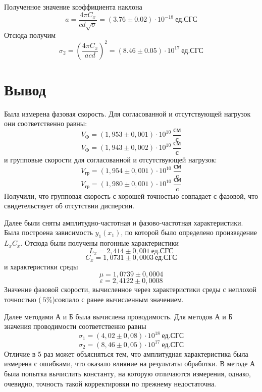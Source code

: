 \documentclass[a4paper,12pt]{article}
\theoremstyle{definition}
\begin{document}
	Полученное значение коэффициента наклона
	\[a=\frac{4\pi C_x}{cd\sqrt{\sigma}}=(3.76\pm0.02)\cdot10^{-18}\:\text{ед.СГС}\]
	Отсюда получим
	\begin{equation}
		\sigma_2=\left(\frac{4\pi C_x}{acd}\right)^2=(8.46\pm0.05)\cdot10^{17}\:\text{ед.СГС}
	\end{equation}

	\section{Вывод}
	
	Была измерена фазовая скорость. Для согласованной и отсутствующей нагрузок
	они соответственно равны:
	\[V_\text{Ф}=(1,953\pm0,001)\cdot10^{10}\:\frac{\text{см}}{\text{с}}\]
	\[V_\text{Ф}=(1,943\pm0,002)\cdot10^{10}\:\frac{\text{см}}{\text{с}}\]
	и групповые скорости для согласованной и отсутствующей нагрузок:
	\[V_\text{гр}=(1,954\pm0,001)\cdot10^{10}\:\frac{\text{см}}{\text{c}}\]
	\[V_\text{гр}=(1,980\pm0,001)\cdot10^{10}\:\frac{\text{см}}{\text{c}}\]
	Получили, что групповая скорость с хорошей точностью совпадает с фазовой, что свидетельствует об отсутствии дисперсии.
	
	Далее были сняты амплитудно-частотная и фазово-частотная характеристики. Была построена зависимость $y_1(x_1)$, по которой было определено произведение $L_xC_x$. Отсюда были получены погонные характеристики
	\begin{equation*}
		L_x=2,414\pm0,001\:\text{ед.СГС}
	\end{equation*}
	\begin{equation*}
		C_x=1,0731\pm0,0003\:\text{ед.СГС}
	\end{equation*}
	и характеристики среды
	\begin{equation*}
		\mu=1,0739\pm0,0004
	\end{equation*}
	\begin{equation*}
		\varepsilon=2,4122\pm0,0008
	\end{equation*}
	Значение фазовой скорости, вычисленное через характеристики среды с неплохой точностью ($~5\%$)совпало с ранее вычисленным значением.
	
	Далее методами А и Б была вычислена проводимость. Для методов А и Б значения проводимости соответственно равны
	\begin{equation*}
		\sigma_1 =(4,02\pm0,08)\cdot10^{18}\:\text{ед.СГС}
	\end{equation*}
	\begin{equation*}
		\sigma_2=(8,46\pm0,05)\cdot10^{17}\:\text{ед.СГС}
	\end{equation*}
	Отличие в 5 раз может объясняться тем, что амплитудная характеристика была измерена с ошибками, что оказало влияние на результаты обработки. В методе А была попытка вычислить константу, на которую отличаются измерения, однако, очевидно, точность такой корректировки по прежнему недостаточна.
\end{document}
